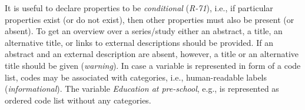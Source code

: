 \documentclass[conference]{IEEEtran}
\newenvironment{DL}{
  \small
  \vspace{0cm}
	\begin{center}
  \begin{tabular}{c l}

}{
  \end{tabular}
	\end{center}
}
\begin{document}
It is useful to declare properties to be \emph{conditional} (\emph{R-71}), i.e., if particular properties exist (or do not exist), then other properties must also be present (or absent).
To get an overview over a series/study either an abstract, a title, an alternative title, or links to external descriptions should be provided. 
If an abstract and an external description are absent, however,  
a title or an alternative title should be given (\emph{warning}).
In case a variable is represented in form of a code list, codes may be associated with categories, i.e., human-readable labels (\emph{informational}).
The variable \emph{Education at pre-school}, e.g., is represented as ordered code list without any categories.



%
%
\end{document}
